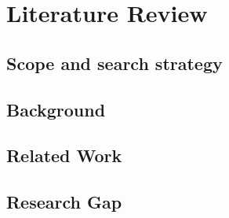 \chapter{Literature Review}
\label{ch:lit_review}


\section{Scope and search strategy}

\section{Background}

\section{Related Work}






\section{Research Gap}
